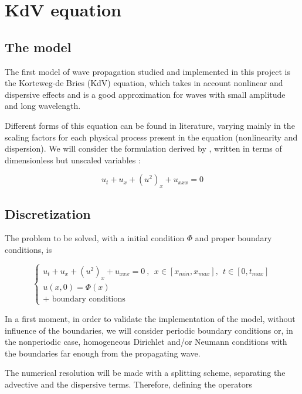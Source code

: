 \section{KdV equation}
\label{sec:KdV}

\subsection{The model}

\indent The first model of wave propagation studied and implemented in this project is the Korteweg-de Bries (KdV) equation, which takes in account  nonlinear and dispersive effects and is a good approximation for waves with small amplitude and long wavelength.

\indent Different forms of this equation can be found in literature, varying mainly in the scaling factors for each physical process present in the equation (nonlinearity and dispersion). We will consider the formulation derived by \cite{BBM1971}, written in terms of dimensionless but unscaled variables :

\begin{equation}
    u_t + u_x + (u^2)_x + u_{xxx} = 0
\end{equation}

\subsection{Discretization}

\indent The problem to be solved, with a initial condition $\Phi$ and proper boundary conditions, is

\begin{equation}
\begin{cases}
    u_t + u_x + (u^2)_x + u_{xxx} = 0 \ , \ \ x \in [x_{min},x_{max}], \ \ t \in [0, t_{max}] \\
    u(x,0) = \Phi(x) \\
    \text{+ boundary conditions}
\end{cases}
\end{equation}

\indent In a first moment, in order to validate the implementation of the model, without influence of the boundaries, we will consider periodic boundary conditions or, in the nonperiodic case, homogeneous Dirichlet and/or Neumann conditions with the boundaries far enough from the propagating wave.

\indent The numerical resolution will be made with a splitting scheme, separating the advective and the dispersive terms. Therefore, defining the operators

